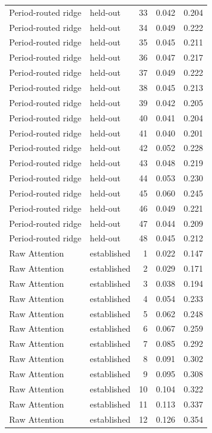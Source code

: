 \begin{tabular}{llrrr}
Period-routed ridge & held-out & 33 & 0.042 & 0.204 \\
Period-routed ridge & held-out & 34 & 0.049 & 0.222 \\
Period-routed ridge & held-out & 35 & 0.045 & 0.211 \\
Period-routed ridge & held-out & 36 & 0.047 & 0.217 \\
Period-routed ridge & held-out & 37 & 0.049 & 0.222 \\
Period-routed ridge & held-out & 38 & 0.045 & 0.213 \\
Period-routed ridge & held-out & 39 & 0.042 & 0.205 \\
Period-routed ridge & held-out & 40 & 0.041 & 0.204 \\
Period-routed ridge & held-out & 41 & 0.040 & 0.201 \\
Period-routed ridge & held-out & 42 & 0.052 & 0.228 \\
Period-routed ridge & held-out & 43 & 0.048 & 0.219 \\
Period-routed ridge & held-out & 44 & 0.053 & 0.230 \\
Period-routed ridge & held-out & 45 & 0.060 & 0.245 \\
Period-routed ridge & held-out & 46 & 0.049 & 0.221 \\
Period-routed ridge & held-out & 47 & 0.044 & 0.209 \\
Period-routed ridge & held-out & 48 & 0.045 & 0.212 \\
Raw Attention & established & 1 & 0.022 & 0.147 \\
Raw Attention & established & 2 & 0.029 & 0.171 \\
Raw Attention & established & 3 & 0.038 & 0.194 \\
Raw Attention & established & 4 & 0.054 & 0.233 \\
Raw Attention & established & 5 & 0.062 & 0.248 \\
Raw Attention & established & 6 & 0.067 & 0.259 \\
Raw Attention & established & 7 & 0.085 & 0.292 \\
Raw Attention & established & 8 & 0.091 & 0.302 \\
Raw Attention & established & 9 & 0.095 & 0.308 \\
Raw Attention & established & 10 & 0.104 & 0.322 \\
Raw Attention & established & 11 & 0.113 & 0.337 \\
Raw Attention & established & 12 & 0.126 & 0.354 \\

\end{tabular}
